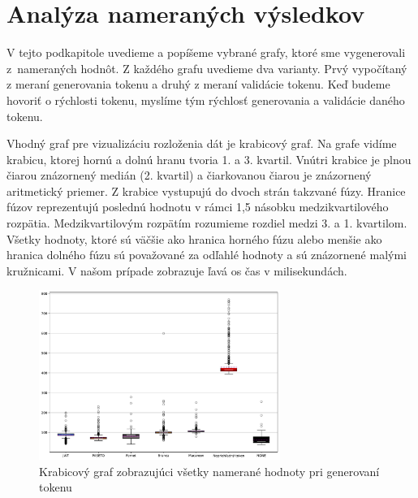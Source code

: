 \section{Analýza nameraných výsledkov}
\label{sec:vyhodnotenie}

V tejto podkapitole uvedieme a popíšeme vybrané grafy, ktoré sme vygenerovali z~nameraných hodnôt. Z každého grafu uvedieme dva varianty. Prvý vypočítaný z meraní generovania tokenu a druhý z meraní validácie tokenu. Keď budeme hovoriť o rýchlosti tokenu, myslíme tým rýchlosť generovania a validácie daného tokenu.

Vhodný graf pre vizualizáciu rozloženia dát je krabicový graf. Na grafe vidíme krabicu, ktorej hornú a dolnú hranu tvoria 1. a 3. kvartil. Vnútri krabice je plnou čiarou znázornený medián (2. kvartil) a čiarkovanou čiarou je znázornený aritmetický priemer. Z krabice vystupujú do dvoch strán takzvané fúzy. Hranice fúzov reprezentujú poslednú hodnotu v rámci 1,5 násobku medzikvartilového rozpätia. Medzikvartilovým rozpätím rozumieme rozdiel medzi 3. a 1. kvartilom. Všetky hodnoty, ktoré sú väčšie ako hranica horného fúzu alebo menšie ako hranica dolného fúzu sú považované za odľahlé hodnoty a sú znázornené malými kružnicami. V našom prípade zobrazuje ľavá os čas v milisekundách.

\begin{figure}[H]
  \centerline{\includegraphics[width=0.7\textwidth]{images/signin_boxplot_allW}}
  \caption[Krabicový graf -- generovanie, všetky hodnoty]{Krabicový graf zobrazujúci všetky namerané hodnoty pri generovaní tokenu}
  \label{fig:signin_boxplot_allW}
\end{figure}

